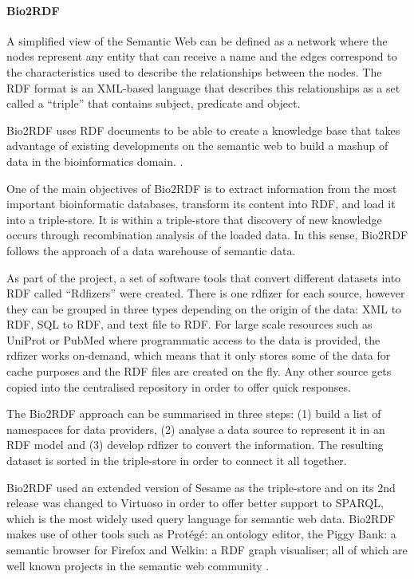 \paragraph{Bio2RDF}
A simplified view of the Semantic Web can be defined as a network where the nodes represent any entity that can receive a name and the edges correspond to the characteristics used to describe the relationships between the nodes. The RDF format is an XML-based language that describes this relationships as a set called a ``triple'' that contains subject, predicate and object.

Bio2RDF uses RDF documents to be able to create a knowledge base that takes advantage of existing developments on the semantic web to build a mashup of data in the bioinformatics domain.  \cite{BEL2008}.

One of the main objectives of Bio2RDF is to extract information from the most important bioinformatic databases, transform its content into RDF, and load it into a triple-store. It is within a triple-store that discovery of new knowledge occurs through recombination analysis of the loaded data. In this sense, Bio2RDF follows the approach of a data warehouse of semantic data.

As part of the project, a set of software tools that convert different datasets into RDF called ``Rdfizers'' were created. There is one rdfizer for each source, however they can be grouped in three types depending on the origin of the data: XML to RDF, SQL to RDF, and text file to RDF. For large scale resources such as UniProt or PubMed where programmatic access to the data is provided, the rdfizer works on-demand, which means that it only stores some of the data for cache purposes and the RDF files are created on the fly. Any other source gets copied into the centralised repository in order to offer quick responses.

The Bio2RDF approach can be summarised in three steps: (1) build a list of namespaces for data providers, (2) analyse a data source to represent it in an RDF model and (3) develop rdfizer to convert the information. The resulting dataset is sorted in the triple-store in order to connect it all together.

Bio2RDF used an extended version of Sesame as the triple-store and on its 2nd release was changed to Virtuoso in order to offer better support to SPARQL, which is the most widely used query language for semantic web data. Bio2RDF makes use of other tools such as Protégé: an ontology editor, the Piggy Bank: a semantic browser for Firefox and Welkin: a RDF graph visualiser; all of which are well known projects in the semantic web community \cite{BEL2008}.

